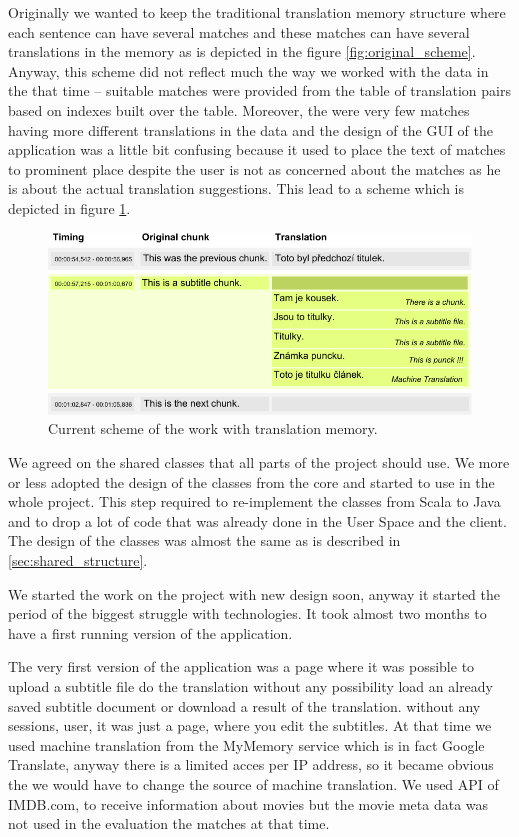 Originally we wanted to keep the traditional translation memory structure where each sentence can have several matches and these matches can have several translations in the memory as is depicted in the figure \ref{fig:original_scheme}. Anyway, this scheme did not reflect much the way we worked with the data in the that time -- suitable matches were provided from the table of translation pairs based on indexes built over the table. Moreover, the were very few matches having more different translations in the data and the design of the GUI of the application was a little bit confusing because it used to place the text of matches to prominent place despite the user is not as concerned about the matches as he is about the actual translation suggestions. This lead to a scheme which is depicted in figure \ref{fig:new_scheme}.

\begin{figure}
\begin{center}
\includegraphics{./figures/current_strucutre.pdf}
\end{center}
\caption{Current scheme of the work with translation memory.}\label{fig:new_scheme}
\end{figure}

We agreed on the shared classes that all parts of the project should use.  We more or less adopted the design of the classes from the core and started to use in the whole project. This step required to re-implement the classes from Scala to Java and to drop a lot of code that was already done in the User Space and the client. The design of the classes was almost the same as is described in \ref{sec:shared_structure}.

We started the work on the project with new design soon, anyway it started the period of the biggest struggle with technologies. It took almost two months to have a first running version of the application.

The very first version of the application was a page where it was possible to upload a subtitle file do the translation without any possibility load an already saved subtitle document or download a result of the translation. without any sessions, user, it was just a page, where you edit the subtitles. At that time we used machine translation from the MyMemory service which is in fact Google Translate, anyway there is a limited acces per IP address, so it became obvious the we would have to change the source of machine translation. We used API of IMDB.com, to receive information about movies but the movie meta data was not used in the evaluation the matches at that time.

